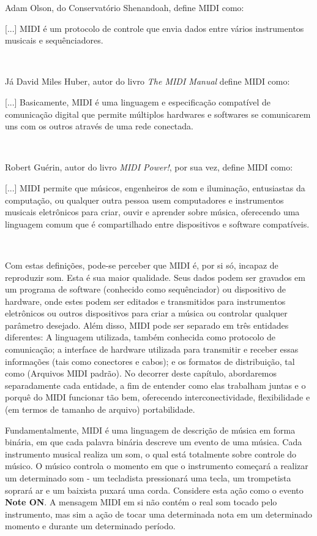             Adam Olson, do Conservatório Shenandoah, define MIDI como: \epigraph{[...] MIDI é um protocolo de controle que envia dados entre vários instrumentos musicais e sequênciadores.}{~\cite{McGuire}}

            Já David Miles Huber, autor do livro \textit{The MIDI Manual} define MIDI como: \epigraph{[...] Basicamente, MIDI é uma linguagem e especificação compatível de comunicação digital que permite múltiplos hardwares e softwares se comunicarem uns com os outros através de uma rede conectada.}{~\cite{Huber}}

            Robert Guérin, autor do livro \textit{MIDI Power!}, por sua vez, define MIDI como: \epigraph{[...] MIDI permite que músicos, engenheiros de som e iluminação, entusiastas da computação, ou qualquer outra pessoa usem computadores e instrumentos musicais eletrônicos para criar, ouvir e aprender sobre música, oferecendo uma linguagem comum que é compartilhado entre dispositivos e software compatíveis.}{~\cite{Guerin}}

            Com estas definições, pode-se perceber que MIDI é, por si só, incapaz de reproduzir som. Esta é sua maior qualidade. Seus dados podem ser gravados em um programa de software (conhecido como sequênciador) ou dispositivo de hardware, onde estes podem ser editados e transmitidos para instrumentos eletrônicos ou outros dispositivos para criar a música ou controlar qualquer parâmetro desejado. Além disso, MIDI pode ser separado em três entidades diferentes: A linguagem utilizada, também conhecida como protocolo de comunicação; a interface de hardware utilizada para transmitir e receber essas informações (tais como conectores e cabos); e os formatos de distribuição, tal como  (Arquivos MIDI padrão). No decorrer deste capítulo, abordaremos separadamente cada entidade, a fim de entender como elas trabalham juntas e o porquê do MIDI funcionar tão bem, oferecendo interconectividade, flexibilidade e (em termos de tamanho de arquivo) portabilidade.

            Fundamentalmente, MIDI é uma linguagem de descrição de música em forma binária, em que cada palavra binária descreve um evento de uma música. Cada instrumento musical realiza um som, o qual está totalmente sobre controle do músico. O músico controla o momento em que o instrumento começará a realizar um determinado som - um tecladista pressionará uma tecla, um trompetista soprará ar e um baixista puxará uma corda. Considere esta ação como o evento \textbf{Note ON}. A mensagem MIDI em si não contém o real som tocado pelo instrumento, mas sim a ação de tocar uma determinada nota em um determinado momento e durante um determinado período.

